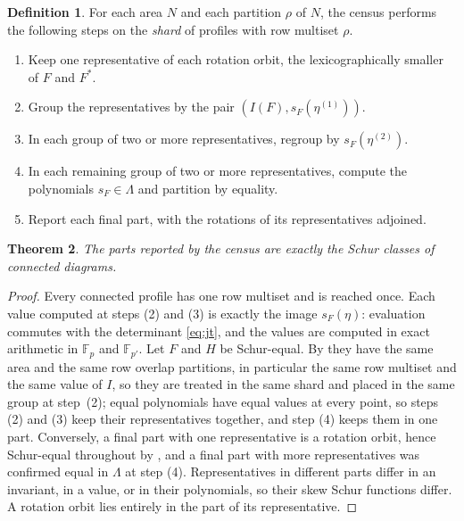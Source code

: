 \documentclass[11pt,a4paper]{amsart}
\numberwithin{equation}{section}
\theoremstyle{plain}
\newtheorem{theorem}{Theorem}[section]
\theoremstyle{definition}
\newtheorem{definition}[theorem]{Definition}
\newcommand{\Lam}{\Lambda}
\begin{document}
\begin{definition}\label{def:census}
For each area \(N\) and each partition \(\rho\) of \(N\), the census performs the following steps on the \emph{shard} of profiles with row multiset \(\rho\).
\begin{enumerate}
\item Keep one representative of each rotation orbit, the lexicographically smaller of \(F\) and \(F^*\).
\item Group the representatives by the pair \((I(F),s_F(\eta^{(1)}))\).
\item In each group of two or more representatives, regroup by \(s_F(\eta^{(2)})\).
\item In each remaining group of two or more representatives, compute the polynomials \(s_F\in\Lam\) and partition by equality.
\item Report each final part, with the rotations of its representatives adjoined.
\end{enumerate}
\end{definition}

\begin{theorem}\label{thm:census}
The parts reported by the census are exactly the Schur classes of connected diagrams.
\end{theorem}

\begin{proof}
Every connected profile has one row multiset and is reached once.  Each value computed at steps (2) and (3) is exactly the image \(s_F(\eta)\): evaluation commutes with the determinant \eqref{eq:jt}, and the values are computed in exact arithmetic in \(\mathbb F_p\) and \(\mathbb F_{p'}\).  Let \(F\) and \(H\) be Schur-equal.  By  they have the same area and the same row overlap partitions, in particular the same row multiset and the same value of \(I\), so they are treated in the same shard and placed in the same group at step~(2); equal polynomials have equal values at every point, so steps (2) and (3) keep their representatives together, and step (4) keeps them in one part.  Conversely, a final part with one representative is a rotation orbit, hence Schur-equal throughout by , and a final part with more representatives was confirmed equal in \(\Lam\) at step (4).  Representatives in different parts differ in an invariant, in a value, or in their polynomials, so their skew Schur functions differ.  A rotation orbit lies entirely in the part of its representative.
\end{proof}
\end{document}
